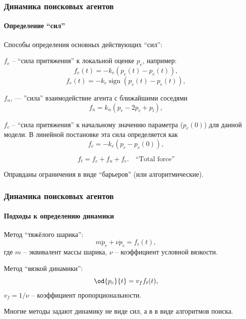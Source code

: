 \documentclass[10pt,utf8]{beamer}
\DeclareMathOperator*{\sign}{sign}
\begin{document}
\begin{frame}
  \frametitle{Динамика поисковых агентов}
  \framesubtitle{Определение ``сил''}

  Способы определения основных действующих ``сил'':

$f_e$ -- ``сила притяжения'' к локальной оценке $p_e$, например:
%
\begin{equation}
  f_e(t) = - k_e ( p_c(t) - p_e(t) ) ,
  \label{atu:eq:f_e_lin}
\end{equation}
%
\begin{equation}
  f_e(t) = - k_e \sign( p_c(t) - p_e(t) ) ,
  \label{atu:eq:f_e_sign}
\end{equation}

$f_n$, --- ''сила'' взаимодействие агента с ближайшими соседями
%
\begin{equation}
  f_n = k_n ( p_r - 2 p_c + p_l ),
  \label{atu:eq:f_n_lin}
\end{equation}

  $f_c$  -- ``сила притяжения'' к начальному значению
  параметра ($p_{c}(0)$)
  для данной модели. В линейной постановке эта сила определяется как
  \begin{equation}
    f_c = -k_c (p_c - p_{c}(0)) ,
    \label{atu:eq:f_c}
  \end{equation}


  \begin{equation}
    f_t = f_c + f_n + f_e . \quad \text{``Total force''}
    \label{atu:eq:f_t}
  \end{equation}

  Оправданы ограничения в виде ``барьеров'' (или алгоритмические).

\end{frame}



\begin{frame}
  \frametitle{Динамика поисковых агентов}
  \framesubtitle{Подходы к определению динамики}

Метод ``тяжёлого шарика'':
%
\begin{equation}
  m \ddot{p}_c + \nu \dot{p}_c = f_t(t),
  \label{atu:eq:heavy_ball}
\end{equation}
%
где $m$ -- эквивалент массы шарика,
$\nu$ -- коэффициент условной вязкости.

\medskip

Метод ``вязкой динамики'':
%
  \begin{equation}
  \od{p_c}{t} = v_f f_t(t),
  \label{atu:eq:v_f}
\end{equation}
%
\noindent
$v_f = 1/\nu$ -- коэффициент пропорциональности.

\smallskip

Многие методы задают динамику не виде сил,
а в в виде алгоритмов поиска.


\end{frame}
\end{document}
